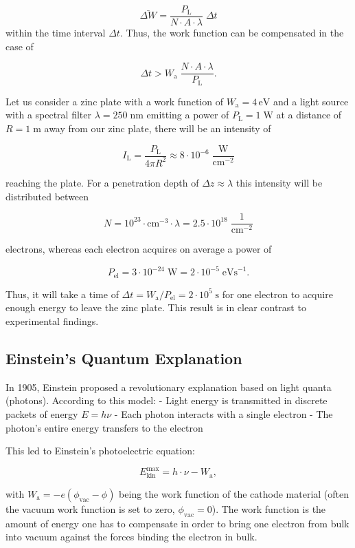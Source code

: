 \documentclass[
  a4paper,
]{book}
\begin{document}
\[
\bar{\Delta W} = \frac{P_\mathrm{L}}{N \cdot A \cdot \lambda} \; \Delta t
\] within the time interval \(\Delta t\). Thus, the work function can be
compensated in the case of

\[
\Delta t > W_{\mathrm{a}} \; \frac{N \cdot A \cdot \lambda}{P_\mathrm{L}} \mathrm{.}
\]

Let us consider a zinc plate with a work function of
\(W_{\mathrm{a}} = 4 \, \mathrm{eV}\) and a light source with a spectral
filter \(\lambda = 250 \; \mathrm{nm}\) emitting a power of
\(P_\mathrm{L} = 1 \; \mathrm{W}\) at a distance of
\(R = 1 \; \mathrm{m}\) away from our zinc plate, there will be an
intensity of

\[
I_{\mathrm{L}} = \frac{P_\mathrm{L}}{4\pi R^2} \approx 8\cdot 10^{-6} \; \frac{\mathrm{W}}{\mathrm{cm}^{-2}}
\]

reaching the plate. For a penetration depth of
\(\Delta z \approx \lambda\) this intensity will be distributed between

\[
N = 10^{23} \cdot \mathrm{cm}^{-3}\cdot \lambda = 2.5 \cdot 10^{18} \; \frac{1}{{\mathrm{cm}^{-2}}}
\]

electrons, whereas each electron acquires on average a power of

\[
P_{\mathrm{el}} = 3 \cdot 10^{-24} \; \mathrm{W} = 2 \cdot 10^{-5} \; \mathrm{eVs}^{-1} \mathrm{.}
\]

Thus, it will take a time of
\(\Delta t = W_{\mathrm{a}}/P_{\mathrm{el}} = 2 \cdot 10^5 \; \mathrm{s}\)
for one electron to acquire enough energy to leave the zinc plate. This
result is in clear contrast to experimental findings.

\subsection{Einstein's Quantum
Explanation}\label{einsteins-quantum-explanation}

In 1905, Einstein proposed a revolutionary explanation based on light
quanta (photons). According to this model: - Light energy is transmitted
in discrete packets of energy \(E = h\nu\) - Each photon interacts with
a single electron - The photon's entire energy transfers to the electron

This led to Einstein's photoelectric equation:

\[
E_{\mathrm{kin}}^{\mathrm{max}} = h \cdot \nu - W_{\mathrm{a}} \mathrm{,}
\]

with \(W_{\mathrm{a}} = -e \left( \phi_{\mathrm{vac}} - \phi \right)\)
being the work function of the cathode material (often the vacuum work
function is set to zero, \(\phi_{\mathrm{vac}} = 0\)). The work function
is the amount of energy one has to compensate in order to bring one
electron from bulk into vacuum against the forces binding the electron
in bulk.
\end{document}
